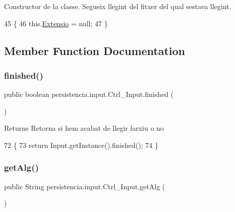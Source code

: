 Constructor de la classe. Segueix llegint del fitxer del qual s\textquotesingle{}estava llegint. 


\begin{DoxyCode}
45                         \{
46         this.\hyperlink{classpersistencia_1_1input_1_1Ctrl__Input_a6041b56aa31f01f75d02382f98e259e5}{Extensio} = null;
47     \}
\end{DoxyCode}


\subsection{Member Function Documentation}
\mbox{\label{classpersistencia_1_1input_1_1Ctrl__Input_a5a94d207dce0fd592b5ac17f55154d4f}} 
\subsubsection{\texorpdfstring{finished()}{finished()}}
{\footnotesize\ttfamily public boolean persistencia.\+input.\+Ctrl\+\_\+\+Input.\+finished (\begin{DoxyParamCaption}{ }\end{DoxyParamCaption})\hspace{0.3cm}{\ttfamily [inline]}}

\begin{DoxyReturn}{Returns}
Retorna si hem acabat de llegir l\textquotesingle{}arxiu o no 
\end{DoxyReturn}

\begin{DoxyCode}
72                               \{
73         \textcolor{keywordflow}{return} Input.getInstance().finished();
74     \}
\end{DoxyCode}
\mbox{\label{classpersistencia_1_1input_1_1Ctrl__Input_aa69f79fb581f6d80c5a9609148794570}} 
\subsubsection{\texorpdfstring{get\+Alg()}{getAlg()}}
{\footnotesize\ttfamily public String persistencia.\+input.\+Ctrl\+\_\+\+Input.\+get\+Alg (\begin{DoxyParamCaption}{ }\end{DoxyParamCaption})\hspace{0.3cm}{\ttfamily [inline]}}

